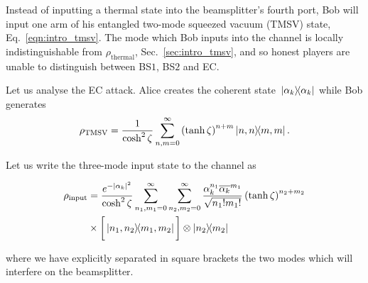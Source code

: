 Instead of inputting a thermal state into the beamsplitter's fourth port, Bob will input one arm of his entangled two-mode squeezed vacuum (TMSV) state, Eq.~\ref{eqn:intro_tmsv}. The mode which Bob inputs into the channel is locally indistinguishable from $\rho_{\text{thermal}}$, Sec.~\ref{sec:intro_tmsv}, and so honest players are unable to distinguish between BS$1$, BS$2$ and EC.



Let us analyse the EC attack. Alice creates the coherent state $\dyad*{\alpha_k}$ while Bob generates
\begin{equation}\label{eqn:qds_ec_tmsv}
\tmsv = \frac{1}{\cosh^2 \zeta}  \sum_{n, m=0}^\infty \left(\tanh\zeta\right)^{n+m} \dyad{n, n}{m, m}.
\end{equation}

\noindent Let us write the three-mode input state to the channel as

\begin{align}
\rho_{\text{input}} &= \frac{e^{-\left|\alpha_k\right|^2}}{\cosh^2 \zeta} \sum_{n_1, m_1=0}^\infty \sum_{n_2, m_2=0}^{\infty} \frac{\alpha_k^{n_1} \overline{\alpha_k}^{m_1}}{\sqrt{n_1! m_1!}} \left(\tanh\zeta\right)^{n_2 + m_2} \notag \\
&\times \bigg[\dyad{n_1, n_2}{m_1, m_2}\bigg] \otimes \dyad{n_2}{m_2}
\end{align}

\noindent where we have explicitly separated in square brackets the two modes which will interfere on the beamsplitter.

